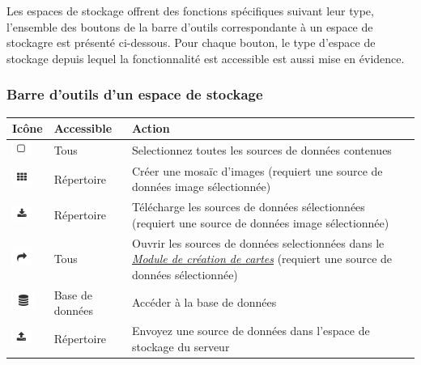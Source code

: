 \documentclass[letterpaper,10pt,french]{sphinxmanual}
\begin{document}
Les espaces de stockage offrent des fonctions spécifiques suivant leur
type, l'ensemble des boutons de la barre d'outils correspondante à un
espace de stockagre est présenté ci-dessous. Pour chaque bouton, le
type d'espace de stockage depuis lequel la fonctionnalité est
accessible est aussi mise en évidence.


\subsubsection{Barre d'outils d'un espace de stockage}
\label{data/datastores:barre-d-outils-d-un-espace-de-stockage}
\begin{tabulary}{\linewidth}{|L|L|L|}
\hline

\textbf{Icône}
 & 
\textbf{Accessible}
 & 
\textbf{Action}
\\
\hline
\includegraphics{select.png}
 & 
Tous
 & 
Selectionnez toutes les sources de données contenues
\\
\hline
\includegraphics{tile.png}
 & 
Répertoire
 & 
Créer une mosaïc d'images (requiert une source de données image sélectionnée)
\\
\hline
\includegraphics{download.png}
 & 
Répertoire
 & 
Télécharge les sources de données sélectionnées (requiert une source de données image sélectionnée)
\\
\hline
\includegraphics{share.png}
 & 
Tous
 & 
Ouvrir les sources de données selectionnées dans le {\hyperref[maps/index:maps]{\emph{Module de création de cartes}}} (requiert une source de données sélectionnée)
\\
\hline
\includegraphics{database.png}
 & 
Base de données
 & 
Accéder à la base de données
\\
\hline
\includegraphics{upload.png}
 & 
Répertoire
 & 
Envoyez une source de données dans l'espace de stockage du serveur

\end{tabulary}
\end{document}
